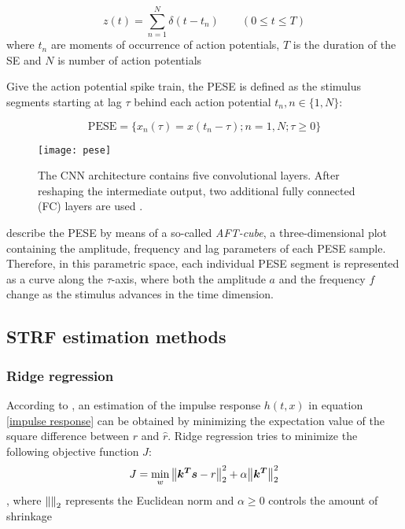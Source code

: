 \begin{equation}
	z(t) = \sum_{n=1}^N \delta(t - t _n) \qquad (0 \leq t \leq T)
\end{equation}
\noindent where $t_n$ are moments of occurrence of action potentials, $T$ is the duration of the SE and $N$ is number of action potentials

Give the action potential spike train, the PESE is defined as the stimulus segments starting at lag $\tau$ behind each action potential $t_n, n \in \{1, N\}$:

\begin{equation}
	\mathrm{PESE} = \{x_n(\tau) = x(t_n - \tau); n = 1, N; \tau \geq 0\}
\end{equation}

\begin{figure}[ht]
	\centering
	\texttt{[image: pese]}
	\caption{The CNN architecture contains five convolutional layers. After reshaping the intermediate output, two additional fully connected (FC) layers are used \parencite{aertsenSpectrotemporalReceptiveFields1980a}.}
\end{figure}

\textcite{aertsenSpectrotemporalReceptiveFields1980} describe the PESE by means of a so-called \emph{AFT-cube}, a three-dimensional plot containing the amplitude, frequency and lag parameters of each PESE sample. Therefore, in this parametric space, each individual PESE segment is represented as a curve along the $\tau$-axis, where both the amplitude $a$ and the frequency $f$ change as the stimulus advances in the time dimension.

\subsection{STRF estimation methods}

\subsubsection{Ridge regression}
According to \textcite{theunissenEstimatingSpatiotemporalReceptive2001}, an estimation of the impulse response $h(t, x)$ in equation \eqref{impulse response} can be obtained by minimizing the expectation value of the square difference between $r$ and $\hat{r}$.
Ridge regression tries to minimize the following objective function $J$:
\begin{equation}
	J = \min_w \norm{\bm{k^T}\bm{s} - r}_2^2 + \alpha \norm{\bm{k^T}}_2^2
\end{equation}
, where $\norm{}_2$ represents the Euclidean norm and $\alpha \geq 0$ controls the amount of shrinkage

